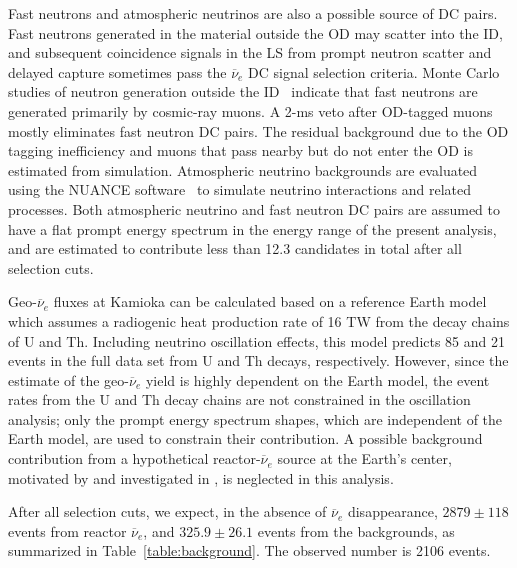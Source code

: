 \documentclass[aps,prc,twocolumn,groupedaddress,showpacs,amsmath,amssymb,floatfix,superscriptaddress]{revtex4}
\begin{document}
Fast neutrons and atmospheric neutrinos are also a possible source of DC pairs. Fast neutrons generated in the material outside the OD may scatter into the ID, and subsequent coincidence signals in the LS from prompt neutron scatter and delayed capture sometimes pass the $\overline{\nu}_{e}$ DC signal selection criteria.   Monte Carlo studies of neutron generation outside the ID~\cite{Abe2010} indicate that fast neutrons are generated primarily by cosmic-ray muons.   A 2-ms veto after OD-tagged muons mostly eliminates fast neutron DC pairs.  The residual background due to the OD tagging inefficiency and muons that pass nearby but do not enter the OD is estimated from simulation.   Atmospheric neutrino backgrounds are evaluated using the  NUANCE software~\cite{Casper2002} to simulate neutrino interactions and related processes.  Both atmospheric neutrino and fast neutron DC pairs are assumed to have a flat prompt energy spectrum in the energy range of the present analysis, and are estimated to contribute less than 12.3 candidates in total after all selection cuts.

Geo-$\overline{\nu}_{e}$ fluxes at Kamioka can be calculated based on a reference Earth model~\cite{Enomoto2007} which assumes a radiogenic heat production rate of 16 TW from the decay chains of U and Th.  Including neutrino oscillation effects, this model predicts 85 and 21 events in the full data set from U and Th decays, respectively.  However, since the estimate of the geo-$\overline{\nu}_{e}$ yield is highly dependent on the Earth model, the event rates from the U and Th decay chains are not constrained in the oscillation analysis; only the prompt energy spectrum shapes, which are independent of the Earth model, are used to constrain their contribution. 
A possible background contribution from a hypothetical reactor-$\overline{\nu}_{e}$ source at the Earth's center, motivated by \cite{Herndon2003} and investigated in \cite{Bellini2010}, is neglected in this analysis. 

After all selection cuts, we expect, in the absence of $\overline{\nu}_{e}$ disappearance, $2879 \pm 118$ events from reactor $\overline{\nu}_{e}$, and $325.9 \pm 26.1$ events from the backgrounds, as summarized in Table~\ref{table:background}.  The observed number is 2106 events. 
\end{document}
